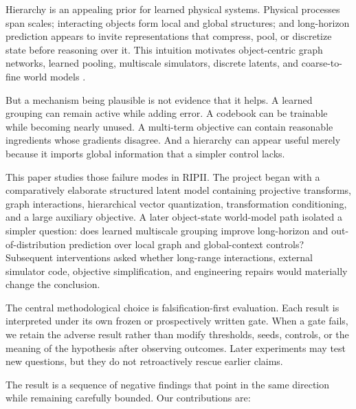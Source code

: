 \documentclass[10pt]{article}
\newcommand{\RIPII}{\textsc{RIPII}}
\begin{document}
Hierarchy is an appealing prior for learned physical systems. Physical processes span scales; interacting objects form local and global structures; and long-horizon prediction appears to invite representations that compress, pool, or discretize state before reasoning over it. This intuition motivates object-centric graph networks, learned pooling, multiscale simulators, discrete latents, and coarse-to-fine world models \citep{battaglia2016interaction,sanchez2018graph,sanchez2020simulate,fortunato2022multiscale,cao2023bistride,vandenoord2017vq,mentzer2023fsq}.

But a mechanism being plausible is not evidence that it helps. A learned grouping can remain active while adding error. A codebook can be trainable while becoming nearly unused. A multi-term objective can contain reasonable ingredients whose gradients disagree. And a hierarchy can appear useful merely because it imports global information that a simpler control lacks.

This paper studies those failure modes in \RIPII. The project began with a comparatively elaborate structured latent model containing projective transforms, graph interactions, hierarchical vector quantization, transformation conditioning, and a large auxiliary objective. A later object-state world-model path isolated a simpler question: does learned multiscale grouping improve long-horizon and out-of-distribution prediction over local graph and global-context controls? Subsequent interventions asked whether long-range interactions, external simulator code, objective simplification, and engineering repairs would materially change the conclusion.

The central methodological choice is falsification-first evaluation. Each result is interpreted under its own frozen or prospectively written gate. When a gate fails, we retain the adverse result rather than modify thresholds, seeds, controls, or the meaning of the hypothesis after observing outcomes. Later experiments may test new questions, but they do not retroactively rescue earlier claims.

The result is a sequence of negative findings that point in the same direction while remaining carefully bounded. Our contributions are:
\end{document}
